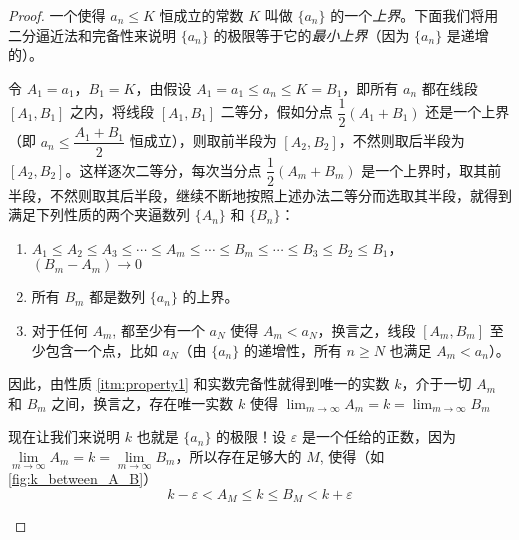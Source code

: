 \begin{proof}
  一个使得 $a_n\leqslant K$ 恒成立的常数 $K$ 叫做 $\{a_n\}$ 的一个\emph{上界}。下面我们将用二分逼近法和完备性来说明 $\{a_n\}$ 的极限等于它的\emph{最小上界}（因为 $\{a_n\}$ 是递增的）。

{\linespread{1.65}\selectfont 令 $A_1=a_1$，$B_1=K$，由假设 $A_1=a_1\leqslant a_n\leqslant K=B_1$，即所有 $a_n$ 都在线段 $[A_1,B_1]$ 之内，将线段 $[A_1,B_1]$ 二等分，假如分点 $\dfrac{1}{2}(A_1+B_1)$ 还是一个上界（即 $a_n\leqslant \dfrac{A_1+B_1}{2}$ 恒成立），则取前半段为 $[A_2,B_2]$，不然则取后半段为 $[A_2,B_2]$。这样逐次二等分，每次当分点 $\dfrac{1}{2}(A_m+B_m)$ 是一个上界时，取其前半段，不然则取其后半段，继续不断地按照上述办法二等分而选取其半段，就得到满足下列性质的两个夹逼数列 $\{A_n\}$ 和 $\{B_n\}$：\par}

\begin{enumerate}
  \item\label{itm:property1} $A_1\leqslant A_2\le A_3\leqslant \cdots \leqslant A_m\leqslant \cdots \leqslant B_m\le \cdots\leqslant B_3\leqslant B_2\leqslant B_1$，$(B_m-A_m)\to 0$
  \item\label{itm:property2} 所有 $B_m$ 都是数列 $\{a_n\}$ 的上界。
  \item\label{itm:property3} 对于任何 $A_m$, 都至少有一个 $a_N$ 使得 $A_m<a_N$，换言之，线段 $[A_m,B_m]$ 至少包含一个点，比如 $a_N$（由 $\{a_n\}$ 的递增性，所有 $n\geqslant N$ 也满足 $A_m<a_n$）。
\end{enumerate}

因此，由性质 \ref{itm:property1} 和实数完备性就得到唯一的实数 $k$，介于一切 $A_m$ 和 $B_m$ 之间，换言之，存在唯一实数 $k$ 使得  $\lim_{m\to\infty}A_m=k=\lim_{m\to\infty}B_m$

现在让我们来说明 $k$ 也就是 $\{a_n\}$ 的极限！设 $\varepsilon$ 是一个任给的正数，因为 $\lim\limits_{m\to\infty}A_m=k=\lim\limits_{m\to\infty}B_m$，所以存在足够大的 $M$, 使得（如\cref{fig:k_between_A_B}）
\begin{equation}
    k-\varepsilon<A_M\le k\le B_M<k+\varepsilon
\end{equation}
\begin{figure}


\end{figure}
\end{proof}
